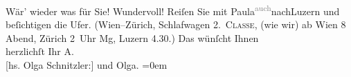 \begin{ledgroupsized}[t]{13cm}
           \pstart
           {\pb}Wär’ wieder was für Sie! Wundervoll! Reiſen Sie mit
                  Paula\substVorne{}\textsuperscript{\textcolor{gray}{auch}}\substDazwischen{}nach\substHinten{}{ }Luzern und beſichtigen die Ufer. (Wien–Zürich, Schlafwagen 2. \textsc{Classe}, (wie wir) ab Wien 8
               Abend, Zürich 2 Uhr \introOben{}Mg\introOben{}, Luzern 4.30.)\pend
           \pstart
           Das wünſcht Ihnen{\\[\baselineskip]}herzlichſt Ihr \spacefill\mbox{A.}{\\[\baselineskip]}{[}hs. Olga Schnitzler:{]} und \spacefill\mbox{Olga.}\pend
           \leftskip=0em{}
         
         \endnumbering{}\end{ledgroupsized}  \newcommand{\dateiname}{L01933}\newcommand{\titel}{Arthur und Olga Schnitzler an Richard Beer-Hofmann, 22. 5. 1910}\newcommand{\editorInnen}{Martin Anton Müller und Gerd-Hermann Susen}
      